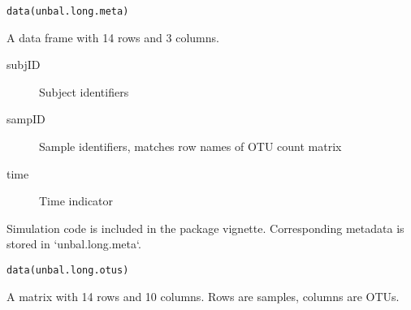 \documentclass[a4paper]{book}
\begin{document}
%
\begin{Usage}
\begin{verbatim}
data(unbal.long.meta)
\end{verbatim}
\end{Usage}
%
\begin{Format}
A data frame with 14 rows and 3 columns. 
\begin{description}

\item[subjID] Subject identifiers
\item[sampID] Sample identifiers, matches row names of OTU count matrix
\item[time] Time indicator

\end{description}
\end{Format}
%
\begin{Description}\relax
Simulation code is included in the package vignette. 
Corresponding metadata is stored in `unbal.long.meta`.
\end{Description}
%
\begin{Usage}
\begin{verbatim}
data(unbal.long.otus)
\end{verbatim}
\end{Usage}
%
\begin{Format}
A matrix with 14 rows and 10 columns. Rows are samples, columns are OTUs.
\end{Format}
\printindex{}
\end{document}
